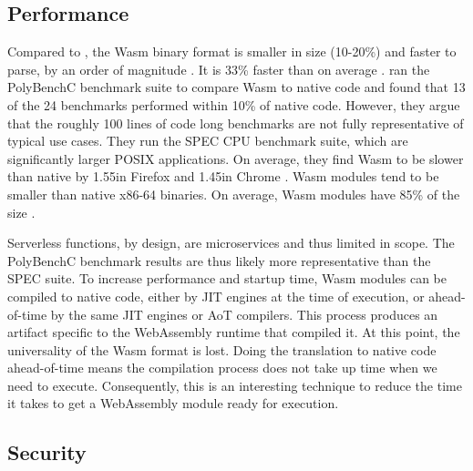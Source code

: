 \subsection{Performance}

Compared to , the Wasm binary format is smaller in size (10-20\%) and faster to parse, by an order of magnitude
\cite{Clark2019}. It is 33\% faster than  on average \cite{Haas2017}.
\citeauthor{NotSoFast} ran the PolyBenchC benchmark suite to compare Wasm to native code and found that 13 of the 24 benchmarks performed within 10\% of native code. However, they argue that the roughly 100 lines of code long benchmarks are not fully representative of typical use cases. They run the SPEC CPU benchmark suite, which are significantly larger POSIX applications. On average, they find Wasm to be slower than native by 1.55\times in Firefox and 1.45\times in Chrome \cite{NotSoFast}.
Wasm modules tend to be smaller than native x86-64 binaries. On average, Wasm modules have 85\% of the size \cite{Haas2017}.

Serverless functions, by design, are microservices and thus limited in scope. The PolyBenchC benchmark results are thus likely more representative than the SPEC suite.
To increase performance and startup time, Wasm modules can be compiled to native code, either by JIT engines at the time of execution, or ahead-of-time by the same JIT engines or AoT compilers. This process produces an artifact specific to the WebAssembly runtime that compiled it. At this point, the universality of the Wasm format is lost. Doing the translation to native code ahead-of-time means the compilation process does not take up time when we need to execute. Consequently, this is an interesting technique to reduce the time it takes to get a WebAssembly module ready for execution.




\subsection{Security}

